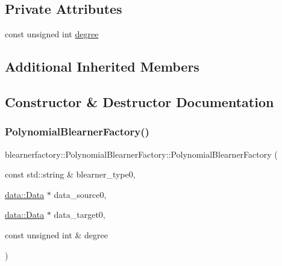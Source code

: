 \subsection*{Private Attributes}
\begin{DoxyCompactItemize}
\item 
const unsigned int \mbox{\hyperlink{classblearnerfactory_1_1_polynomial_blearner_factory_a78c1852e3f1e1b43e6d8bef40032e19f}{degree}}
\end{DoxyCompactItemize}
\subsection*{Additional Inherited Members}


\subsection{Constructor \& Destructor Documentation}
\mbox{\label{classblearnerfactory_1_1_polynomial_blearner_factory_a87a3247a9abe49009e1e951f25ed97cf}} 
\subsubsection{\texorpdfstring{Polynomial\+Blearner\+Factory()}{PolynomialBlearnerFactory()}}
{\footnotesize\ttfamily blearnerfactory\+::\+Polynomial\+Blearner\+Factory\+::\+Polynomial\+Blearner\+Factory (\begin{DoxyParamCaption}\item[{const std\+::string \&}]{blearner\+\_\+type0,  }\item[{\mbox{\hyperlink{classdata_1_1_data}{data\+::\+Data}} $\ast$}]{data\+\_\+source0,  }\item[{\mbox{\hyperlink{classdata_1_1_data}{data\+::\+Data}} $\ast$}]{data\+\_\+target0,  }\item[{const unsigned int \&}]{degree }\end{DoxyParamCaption})}

